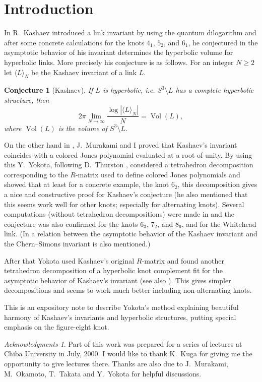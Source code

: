 \documentclass[a4paper]{amsart}
\theoremstyle{plain}
\newtheorem{conj}[thm]{Conjecture}
\theoremstyle{definition}
\theoremstyle{remark}
\newtheorem*{ack}{Acknowledgments}
\newcommand{\Vol}{\operatorname{Vol}}
\numberwithin{equation}{section}
\numberwithin{figure}{section}
\begin{document}
\section{Introduction}\label{sec:introduction}
In \cite{Kashaev:MODPLA95} R.~Kashaev introduced a link invariant by using
the quantum dilogarithm and after some concrete calculations for the knots $4_1$,
$5_2$, and $6_1$, he conjectured
in \cite{Kashaev:LETMP97} the asymptotic behavior of his invariant determines
the hyperbolic volume for hyperbolic links.
More precisely his conjecture is as follows.
For an integer $N\ge2$ let $\langle{L}\rangle_N$ be the Kashaev invariant of
a link $L$.
\begin{conj}[Kashaev]
  If $L$ is hyperbolic, i.e. $S^3\setminus{L}$ has a complete hyperbolic
  structure, then
  \begin{equation*}
    2\pi\lim_{N\to\infty}\frac{\log\left|\langle{L}\rangle_N\right|}{N}=\Vol(L),
  \end{equation*}
  where $\Vol(L)$ is the volume of $S^3\setminus{L}$.
\end{conj}
\par
On the other hand in \cite{Murakami/Murakami:volume}, J.~Murakami and I proved
that Kashaev's invariant coincides with a colored Jones polynomial evaluated
at a root of unity.
By using this Y.~Yokota, following D.~Thurston \cite{D.Thurston:Grenoble},
considered a tetrahedron decomposition corresponding to the $R$-matrix used
to define colored Jones polynomials and showed that at least for a concrete
example, the knot $6_2$, this decomposition gives a nice and constructive proof
for Kashaev's conjecture \cite{Yokota:Murasugi70}
(he also mentioned that this seems work well for other knots; especially for
alternating knots).
Several computations (without tetrahedron decompositions) were made in
\cite{Murakami/Murakami/Okamoto/Takata/Yokota:CS} and the conjecture was also
confirmed for the knots $6_3$, $7_2$, and $8_9$, and for the Whitehead link.
(In \cite{Murakami/Murakami/Okamoto/Takata/Yokota:CS} a relation between the
asymptotic behavior of the Kashaev invariant and the Chern--Simons invariant
is also mentioned.)
\par
After that Yokota used Kashaev's original $R$-matrix and found another
tetrahedron decomposition of a hyperbolic knot complement fit for
the asymptotic behavior of Kashaev's invariant \cite{Yokota:volume}
(see also \cite{Yokota:Topology_Symposium2000}).
This gives simpler decompositions and seems to work much better including
non-alternating knots.
\par
This is an expository note to describe Yokota's method explaining beautiful
harmony of Kashaev's invariants and hyperbolic structures, putting special
emphasis on the figure-eight knot.
\begin{ack}
Part of this work was prepared for a series of lectures at Chiba University
in July, 2000.
I would like to thank K.~Kuga for giving me the opportunity to give lectures
there.
Thanks are also due to J.~Murakami, M.~Okamoto, T.~Takata and Y.~Yokota for
helpful discussions.
\end{ack}
\end{document}
